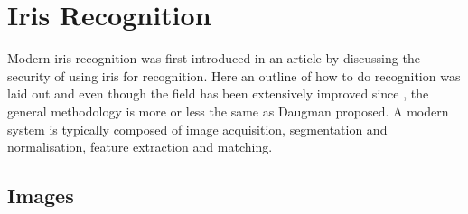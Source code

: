 \section{Iris Recognition}
\label{sec:Iris_Recognition_Research}
Modern iris recognition was first introduced in an article by \cite{Daugman1993} discussing the security of using iris for recognition. Here an outline of how to do recognition was laid out and even though the field has been extensively improved since \cite{Daugman1993}, the general methodology is more or less the same as Daugman proposed. A modern system is typically composed of image acquisition, segmentation and normalisation, feature extraction and matching. 

\subsection{Images}
